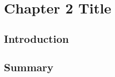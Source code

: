 \documentclass[thesis.tex]{subfiles}
\begin{document}
\chapter{Chapter 2 Title}
\label{cha:cha2}

\section{Introduction}


\section{Summary}


\biblio
\end{document}
